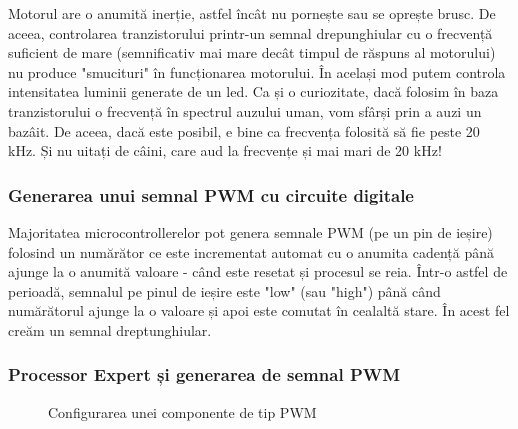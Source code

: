 Motorul are o anumită inerție, astfel încât nu pornește sau se oprește brusc. De aceea, controlarea tranzistorului printr-un semnal drepunghiular cu o frecvență suficient de mare (semnificativ mai mare decât timpul de răspuns al motorului) nu produce "smucituri" în funcționarea motorului. În același mod putem controla intensitatea luminii generate de un led. Ca și o curiozitate, dacă folosim în baza tranzistorului o frecvență în spectrul auzului uman, vom sfârși prin a auzi un bazâit. De aceea, dacă este posibil, e bine ca frecvența folosită să fie peste 20 kHz. Și nu uitați de câini, care aud la frecvențe și mai mari de 20 kHz!

\subsubsection{Generarea unui semnal PWM cu circuite digitale}

Majoritatea microcontrollerelor pot genera semnale PWM (pe un pin de ieșire) folosind un numărător ce este incrementat automat cu o anumita cadență până ajunge la o anumită valoare - când este resetat și procesul se reia. Într-o astfel de perioadă, semnalul pe pinul de ieșire este "low" (sau "high") până când numărătorul ajunge la o valoare și apoi este comutat în cealaltă stare. În acest fel creăm un semnal dreptunghiular.

\subsubsection{Processor Expert și generarea de semnal PWM}

\begin{figure}
  \vspace{-20pt}
  \vspace{-15pt}
  \caption{\label{fig:CodeWarrior-PExPWM} Configurarea unei componente de tip PWM}
  \vspace{-20pt}
\end{figure}

